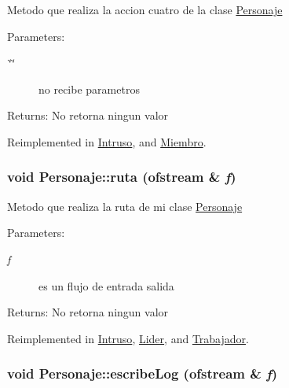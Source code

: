 Metodo que realiza la accion cuatro de la clase \hyperlink{classPersonaje}{Personaje} \begin{Desc}
\item[Parameters:]
\begin{description}
\item[{\em \char`\"{}\char`\"{}}]no recibe parametros \end{description}
\end{Desc}
\begin{Desc}
\item[Returns:]No retorna ningun valor \end{Desc}


Reimplemented in \hyperlink{classIntruso_99e215b1df4387b629f25349378d3bbb}{Intruso}, and \hyperlink{classMiembro_b286484cab275d7754c6ce2b513fdc9a}{Miembro}.\hypertarget{classPersonaje_f6dc20013805229005dfb87fc6f273b5}{
\subsubsection[ruta]{\setlength{\rightskip}{0pt plus 5cm}void Personaje::ruta (ofstream \& {\em f})}}
\label{classPersonaje_f6dc20013805229005dfb87fc6f273b5}


Metodo que realiza la ruta de mi clase \hyperlink{classPersonaje}{Personaje} \begin{Desc}
\item[Parameters:]
\begin{description}
\item[{\em f}]es un flujo de entrada salida \end{description}
\end{Desc}
\begin{Desc}
\item[Returns:]No retorna ningun valor \end{Desc}


Reimplemented in \hyperlink{classIntruso_2898ae82386e99d361f6f131122b7be1}{Intruso}, \hyperlink{classLider_6b98929df0d59cd29b85e6fb8aeb36f1}{Lider}, and \hyperlink{classTrabajador_6b940e57a18466eafa2dcfe0a60313d3}{Trabajador}.\hypertarget{classPersonaje_86fe4a1ff708072d98c6be42bbd512ea}{
\subsubsection[escribeLog]{\setlength{\rightskip}{0pt plus 5cm}void Personaje::escribeLog (ofstream \& {\em f})}}
\label{classPersonaje_86fe4a1ff708072d98c6be42bbd512ea}


